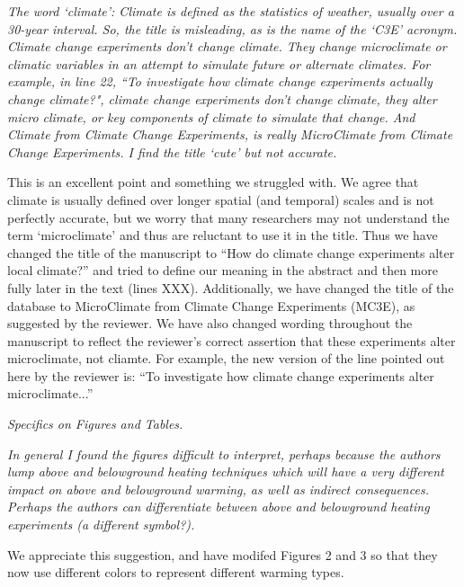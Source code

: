 \documentclass[11pt,a4paper]{letter}
\begin{document}
\begin{letter}{}
\par \emph{The word `climate': Climate is defined as the statistics of weather, usually over a 30-year interval. So, the title is misleading, as is the name of the `C3E' acronym.  Climate change experiments don't change climate.  They change microclimate or climatic variables in an attempt to simulate future or alternate climates.  For example, in line 22, ``To investigate how climate change experiments actually change climate?", climate change experiments don't change climate, they alter micro climate, or key components of climate to simulate that change.  And Climate from Climate Change Experiments, is really MicroClimate from Climate Change Experiments. I find the title `cute' but not accurate.}

\par This is an excellent point and something we struggled with. We agree that climate is usually defined over longer spatial (and temporal) scales and is not perfectly accurate, but we worry that many researchers may not understand the term `microclimate' and thus are reluctant to use it in the title. Thus we have changed the title of the manuscript to ``How do climate change experiments alter local climate?'' and tried to define our meaning in the abstract and then more fully later in the text (lines XXX). Additionally, we have changed the title of the database to MicroClimate from Climate Change Experiments (MC3E), as suggested by the reviewer. We have also changed wording throughout the manuscript to reflect the reviewer's correct assertion that these experiments alter microclimate, not cliamte. For example, the new version of the line pointed out here by the reviewer is: ``To investigate how climate change experiments alter microclimate...''

\par \emph{Specifics on Figures and Tables.}
\par \emph{In general I found the figures difficult to interpret, perhaps because the authors lump above and belowground heating techniques which will have a very different impact on above and belowground warming, as well as indirect consequences.  Perhaps the authors can differentiate between above and belowground heating experiments (a different symbol?).}
\par We appreciate this suggestion, and have modifed Figures 2 and 3 so that they now use different colors  to represent different warming types.


\end{letter}
\end{document}
